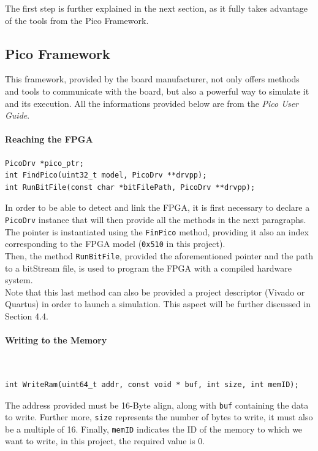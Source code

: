 The first step is further explained in the next section, as it fully takes advantage of the tools from the Pico Framework.


\subsection{Pico Framework}

This framework, provided by the board manufacturer, not only offers methods and tools to communicate with the board, but also a powerful way to simulate it and its execution. All the informations provided below are from the \textit{Pico User Guide}\cite{PICOO}.

\paragraph{Reaching the FPGA}
\begin{verbatim}
PicoDrv *pico_ptr;
int FindPico(uint32_t model, PicoDrv **drvpp);
int RunBitFile(const char *bitFilePath, PicoDrv **drvpp);
\end{verbatim}

In order to be able to detect and link the FPGA, it is first necessary to declare a \texttt{PicoDrv} instance that will then provide all the methods in the next paragraphs. \\
The pointer is instantiated using the \texttt{FinPico} method, providing it also an index corresponding to the FPGA model (\texttt{0x510} in this project).\\
Then, the method \texttt{RunBitFile}, provided the aforementioned pointer and the path to a bitStream file, is used to program the FPGA with a compiled hardware system. \\
Note that this last method can also be provided a project descriptor (Vivado or Quartus) in order to launch a simulation. This aspect will be further discussed in Section 4.4.


\paragraph{Writing to the Memory} \\
\begin{verbatim}
int WriteRam(uint64_t addr, const void * buf, int size, int memID);
\end{verbatim}
The address provided must be 16-Byte align, along with \texttt{buf} containing the data to write. Further more, \texttt{size} represents the number of bytes to write, it must also be a multiple of 16. Finally, \texttt{memID} indicates the ID of the memory to which we want to write, in this project, the required value is 0. \\

